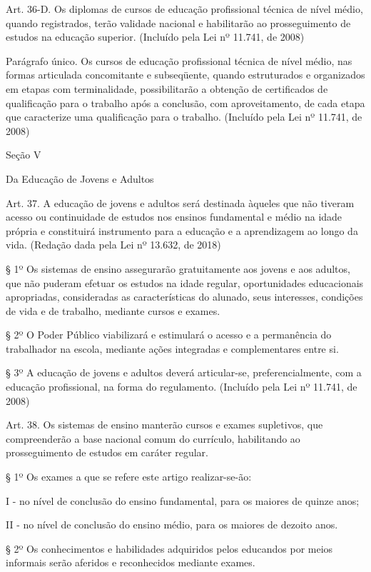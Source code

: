 \documentclass[
]{book}
\begin{document}
Art. 36-D. Os diplomas de cursos de educação profissional técnica de nível médio, quando registrados, terão validade nacional e habilitarão ao prosseguimento de estudos na educação superior. (Incluído pela Lei nº 11.741, de 2008)

Parágrafo único. Os cursos de educação profissional técnica de nível médio, nas formas articulada concomitante e subseqüente, quando estruturados e organizados em etapas com terminalidade, possibilitarão a obtenção de certificados de qualificação para o trabalho após a conclusão, com aproveitamento, de cada etapa que caracterize uma qualificação para o trabalho. (Incluído pela Lei nº 11.741, de 2008)

Seção V

Da Educação de Jovens e Adultos

Art. 37. A educação de jovens e adultos será destinada àqueles que não tiveram acesso ou continuidade de estudos nos ensinos fundamental e médio na idade própria e constituirá instrumento para a educação e a aprendizagem ao longo da vida. (Redação dada pela Lei nº 13.632, de 2018)

§ 1º Os sistemas de ensino assegurarão gratuitamente aos jovens e aos adultos, que não puderam efetuar os estudos na idade regular, oportunidades educacionais apropriadas, consideradas as características do alunado, seus interesses, condições de vida e de trabalho, mediante cursos e exames.

§ 2º O Poder Público viabilizará e estimulará o acesso e a permanência do trabalhador na escola, mediante ações integradas e complementares entre si.

§ 3º A educação de jovens e adultos deverá articular-se, preferencialmente, com a educação profissional, na forma do regulamento. (Incluído pela Lei nº 11.741, de 2008)

Art. 38. Os sistemas de ensino manterão cursos e exames supletivos, que compreenderão a base nacional comum do currículo, habilitando ao prosseguimento de estudos em caráter regular.

§ 1º Os exames a que se refere este artigo realizar-se-ão:

I - no nível de conclusão do ensino fundamental, para os maiores de quinze anos;

II - no nível de conclusão do ensino médio, para os maiores de dezoito anos.

§ 2º Os conhecimentos e habilidades adquiridos pelos educandos por meios informais serão aferidos e reconhecidos mediante exames.
\end{document}
